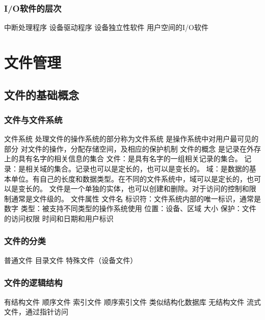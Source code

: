 \documentclass{ctexart}
\begin{document}
\subsubsection{I/O软件的层次}
\begin{outline}
    \1 中断处理程序
    \1 设备驱动程序
    \1 设备独立性软件
    \1 用户空间的I/O软件
\end{outline}
\section{文件管理}
\subsection{文件的基础概念}
\subsubsection{文件与文件系统}
\begin{outline}
    \1 文件系统
        \2 处理文件的操作系统的部分称为文件系统
        \2 是操作系统中对用户最可见的部分
        \2 对文件的操作，分配存储空间，及相应的保护机制
    \1 文件的概念
        \2 是记录在外存上的具有名字的相关信息的集合
        \2 文件：是具有名字的一组相关记录的集合。
        \2 记录：是相关域的集合。记录也可以是定长的，也可以是变长的。
        \2 域：是数据的基本单位。有自己的长度和数据类型。在不同的文件系统中，域可以是定长的，也可以是变长的。
        \2 文件是一个单独的实体，也可以创建和删除。对于访问的控制和限制通常是文件级的。
    \1 文件属性
        \2 文件名
        \2 标识符：文件系统内部的唯一标识，通常是数字
        \2 类型：被支持不同类型的操作系统使用
        \2 位置：设备、区域
        \2 大小
        \2 保护：文件的访问权限
        \2 时间和日期和用户标识
\end{outline}
\subsubsection{文件的分类}
\begin{outline}
    \1 普通文件
    \1 目录文件
    \1 特殊文件（设备文件）
\end{outline}
\subsubsection{文件的逻辑结构}
\begin{outline}
    \1 有结构文件
        \2 顺序文件
        \2 索引文件
        \2 顺序索引文件
        \2 类似结构化数据库
    \1 无结构文件
        \2 流式文件，通过指针访问
\end{outline}
\end{document}
